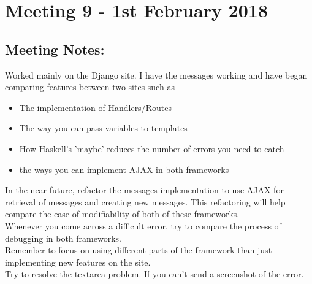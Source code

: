 \section{Meeting 9 - 1st February 2018}

\subsection{Meeting Notes:}
Worked mainly on the Django site. I have the messages working and have began comparing features between two sites such as
\begin{itemize}
  \item The implementation of Handlers/Routes
  \item The way you can pass variables to templates
  \item How Haskell's 'maybe' reduces the number of errors you need to catch
  \item the ways you can implement AJAX in both frameworks
\end{itemize}

In the near future, refactor the messages implementation to use AJAX for retrieval of messages and creating new messages. This refactoring will help compare the ease of modifiability of both of these frameworks.\\
Whenever you come across a difficult error, try to compare the process of debugging in both frameworks.\\
Remember to focus on using different parts of the framework than just implementing new features on the site.\\
Try to resolve the textarea problem. If you can't send a screenshot of the error.\\
